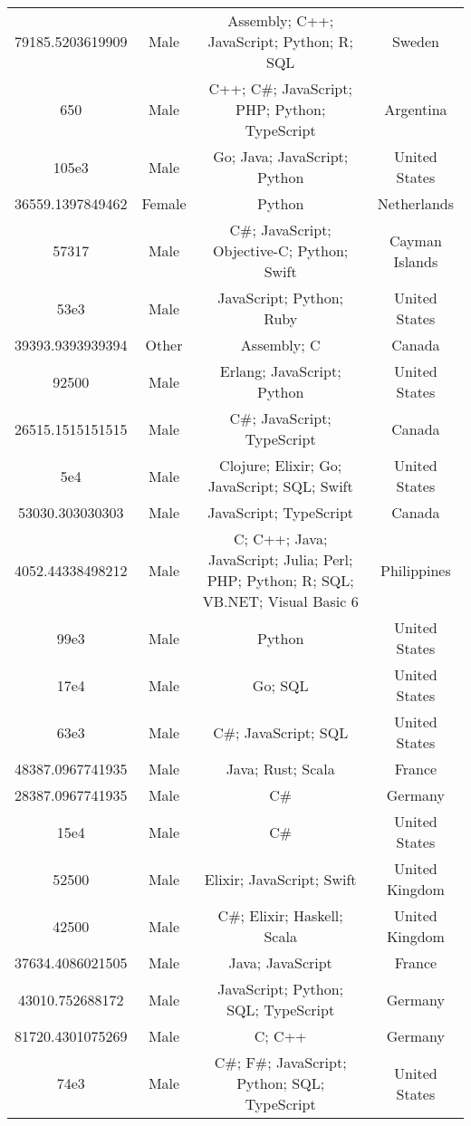 \begin{center}
\begin{tabular}{ |c|c|c|c| }
79185.5203619909  &  Male  &  Assembly; C++; JavaScript; Python; R; SQL  &  Sweden  \\ 
650  &  Male  &  C++; C\#; JavaScript; PHP; Python; TypeScript  &  Argentina  \\ 
105e3  &  Male  &  Go; Java; JavaScript; Python  &  United States  \\ 
36559.1397849462  &  Female  &  Python  &  Netherlands  \\ 
57317  &  Male  &  C\#; JavaScript; Objective-C; Python; Swift  &  Cayman Islands  \\ 
53e3  &  Male  &  JavaScript; Python; Ruby  &  United States  \\ 
39393.9393939394  &  Other  &  Assembly; C  &  Canada  \\ 
92500  &  Male  &  Erlang; JavaScript; Python  &  United States  \\ 
26515.1515151515  &  Male  &  C\#; JavaScript; TypeScript  &  Canada  \\ 
5e4  &  Male  &  Clojure; Elixir; Go; JavaScript; SQL; Swift  &  United States  \\ 
53030.303030303  &  Male  &  JavaScript; TypeScript  &  Canada  \\ 
4052.44338498212  &  Male  &  C; C++; Java; JavaScript; Julia; Perl; PHP; Python; R; SQL; VB.NET; Visual Basic 6  &  Philippines  \\ 
99e3  &  Male  &  Python  &  United States  \\ 
17e4  &  Male  &  Go; SQL  &  United States  \\ 
63e3  &  Male  &  C\#; JavaScript; SQL  &  United States  \\ 
48387.0967741935  &  Male  &  Java; Rust; Scala  &  France  \\ 
28387.0967741935  &  Male  &  C\#  &  Germany  \\ 
15e4  &  Male  &  C\#  &  United States  \\ 
52500  &  Male  &  Elixir; JavaScript; Swift  &  United Kingdom  \\ 
42500  &  Male  &  C\#; Elixir; Haskell; Scala  &  United Kingdom  \\ 
37634.4086021505  &  Male  &  Java; JavaScript  &  France  \\ 
43010.752688172  &  Male  &  JavaScript; Python; SQL; TypeScript  &  Germany  \\ 
81720.4301075269  &  Male  &  C; C++  &  Germany  \\ 
74e3  &  Male  &  C\#; F\#; JavaScript; Python; SQL; TypeScript  &  United States  \\ 

\end{tabular}
\end{center}
